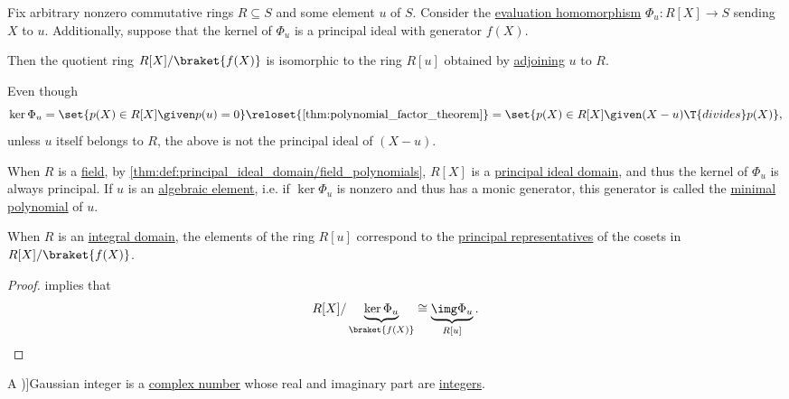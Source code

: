 \begin{proposition}\label{thm:adjoint_roots_and_quotients}
  Fix arbitrary nonzero commutative rings \( R \subseteq S \) and some element \( u \) of \( S \). Consider the \hyperref[con:free_construction/evaluation]{evaluation homomorphism} \( \Phi_u: R[X] \to S \) sending \( X \) to \( u \). Additionally, suppose that the kernel of \( \Phi_u \) is a principal ideal with generator \( f(X) \).

  Then the quotient ring \( R[X] / \braket{ f(X) } \) is isomorphic to the ring \( R[u] \) obtained by \hyperref[def:semiring_adjunction]{adjoining} \( u \) to \( R \).
\end{proposition}
\begin{comments}
  \item Even though
  \begin{equation*}
    \ker \Phi_u
    =
    \set{ p(X) \in R[X] \given p(u) = 0 }
    \reloset {\ref{thm:polynomial_factor_theorem}} =
    \set{ p(X) \in R[X] \given (X - u) \T{divides} p(X) },
  \end{equation*}
  unless \( u \) itself belongs to \( R \), the above is not the principal ideal of \( (X - u) \).

  When \( R \) is a \hyperref[def:field]{field}, by \cref{thm:def:principal_ideal_domain/field_polynomials}, \( R[X] \) is a \hyperref[def:principal_ideal_domain]{principal ideal domain}, and thus the kernel of \( \Phi_u \) is always principal. If \( u \) is an \hyperref[def:algebraic_element]{algebraic element}, i.e. if \( \ker \Phi_u \) is nonzero and thus has a monic generator, this generator is called the \hyperref[def:algebraic_element_minimal_polynomial]{minimal polynomial} of \( u \).

  \item When \( R \) is an \hyperref[def:integral_domain]{integral domain}, the elements of the ring \( R[u] \) correspond to the \hyperref[def:quotient_polynomial_algebra_as_truncated]{principal representatives} of the cosets in \( R[X] / \braket{ f(X) } \).
\end{comments}
\begin{proof}
   implies that
  \begin{equation*}
    R[X] / \underbrace{\ker \Phi_u}_{\braket{ f(X) }} \cong \underbrace{\img \Phi_u}_{R[u]}.
  \end{equation*}
\end{proof}

\begin{definition}\label{def:gaussian_integers}
  A \term[ru=целые гауссовые числа (\cite[example 3.5.1]{Винберг2014КурсАлгебры})]{Gaussian integer} is a \hyperref[def:complex_numbers]{complex number} whose real and imaginary part are \hyperref[def:integers]{integers}.
\end{definition}

